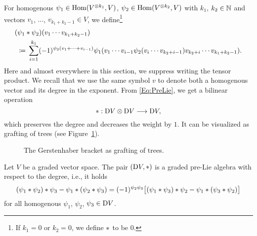 \documentclass[\MainFolder/Text.tex]{subfiles}
\begin{document}
For homogenous $\psi_1 \in \mathrm{Hom}(V^{\otimes k_1},V)$, $\psi_2 \in \mathrm{Hom}(V^{\otimes k_2},V)$ with $k_1$, $k_2\in\mathbb{N}$ and vectors $v_1$, $\dotsc$, $v_{k_1+k_2-1}\in V$, we define\footnote{If $k_1 = 0$ or $k_2 = 0$, we define $*$ to be $0$.}
\begin{equation}\label{Eq:PreLie}
\begin{aligned}
&(\psi_1 \OpPre \psi_2)(v_1 \dotsb v_{k_1 + k_2 -1}) \\
&\ \coloneqq \begin{multlined}[t]\sum_{i=1}^{k_1} (-1)^{\psi_2(v_1 + \dotsb + v_{i-1})}\psi_1(v_1\dotsb v_{i-1} \psi_2(v_i \dotsb v_{k_2 + i -1}) v_{k_2+i} \dotsb v_{k_1 + k_2 - 1}).\end{multlined}
\end{aligned}
\end{equation}
Here and almost everywhere in this section, we suppress writing the tensor product. We recall that we use the same symbol $v$ to denote both a homogenous vector and its degree in the exponent. From \eqref{Eq:PreLie}, we get a bilinear operation 
$$ *: \mathrm{D} V\otimes \mathrm{D} V \longrightarrow \mathrm{D} V, $$
which preserves the degree and decreases the weight by $1$. It can be visualized as grafting of trees (see Figure~\ref{Fig:GraftTrees}).
\begin{figure}
\centering

\caption{The Gerstenhaber bracket as grafting of trees.}
\label{Fig:GraftTrees}
\end{figure}
\begin{Lemma}\label{Lem:PreLie}
Let $V$ be a graded vector space. The pair $(\mathrm{D} V,*)$ is a graded pre-Lie algebra with respect to the degree, i.e., it holds
$$ (\psi_1 * \psi_2)*\psi_3 -  \psi_1 * (\psi_2*\psi_3) = (-1)^{\psi_2 \psi_3}\bigl[(\psi_1 * \psi_3)*\psi_2 - \psi_1 * (\psi_3*\psi_2)\bigr] $$
for all homogenous $\psi_1$, $\psi_2$, $\psi_3 \in \mathrm{D} V$. 
\end{Lemma}
\end{document}
